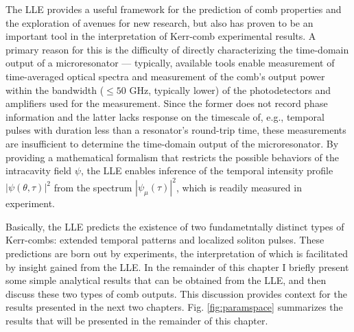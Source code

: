 The LLE provides a useful framework for the prediction of comb properties and the exploration of avenues for new research, but also has proven to be an important tool in the interpretation of Kerr-comb experimental results. A primary reason for this is the difficulty of directly characterizing the time-domain output of a microresonator ---  typically, available tools enable measurement of time-averaged optical spectra and measurement of the comb's output power within the bandwidth ($\leq 50$ GHz, typically lower) of the photodetectors and amplifiers used for the measurement. Since the former does not record phase information and the latter lacks response on the timescale of, e.g., temporal pulses with duration less than a resonator's round-trip time, these measurements are insufficient to determine the time-domain output of the microresonator. By providing a mathematical formalism that restricts the possible behaviors of the intracavity field $\psi$, the LLE enables inference of the temporal intensity profile $|\psi(\theta,\tau)|^2$ from the spectrum $|\psi_\mu(\tau)|^2$, which is readily measured in experiment.  


Basically, the LLE predicts the existence of two fundametntally distinct types of Kerr-combs: extended temporal patterns and localized soliton pulses. These predictions are born out by experiments, the interpretation of which is facilitated by insight gained from the LLE. In the remainder of this chapter I briefly present some simple analytical results that can be obtained from the LLE, and then discuss these two types of comb outputs. This discussion provides context for the results presented in the next two chapters. Fig. \ref{fig:paramspace} summarizes the results that will be presented in the remainder of this chapter.
%

